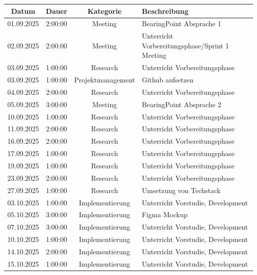 \documentclass{article}
\begin{document}
\begin{table}[H]
  \centering
  \begin{tabularx}{\textwidth}{|c|c|c|X|}
    \hline
    \rowcolor{black!10}\textbf{Datum} & \textbf{Dauer} & \textbf{Kategorie} & \textbf{Beschreibung} \\
    \hline
    01.09.2025 & 2:00:00 & Meeting           & BearingPoint Absprache 1 \\ \hline
    02.09.2025 & 2:00:00 & Meeting           & Unterricht Vorbereitungsphase/Sprint 1 Meeting \\ \hline
    03.09.2025 & 1:00:00 & Research          & Unterricht Vorbereitungsphase \\ \hline
    03.09.2025 & 1:00:00 & Projektmanagement & Github aufsetzen \\ \hline
    04.09.2025 & 2:00:00 & Research          & Unterricht Vorbereitungsphase \\ \hline
    05.09.2025 & 3:00:00 & Meeting           & BearingPoint Absprache 2 \\ \hline
    10.09.2025 & 1:00:00 & Research          & Unterricht Vorbereitungsphase \\ \hline
    11.09.2025 & 2:00:00 & Research          & Unterricht Vorbereitungsphase \\ \hline
    16.09.2025 & 2:00:00 & Research          & Unterricht Vorbereitungsphase \\ \hline
    17.09.2025 & 1:00:00 & Research          & Unterricht Vorbereitungsphase \\ \hline
    19.09.2025 & 1:00:00 & Research          & Unterricht Vorbereitungsphase \\ \hline
    23.09.2025 & 2:00:00 & Research          & Unterricht Vorbereitungsphase \\ \hline
    27.09.2025 & 1:00:00 & Research          & Umsetzung von Techstack \\ \hline
    03.10.2025 & 1:00:00 & Implementierung   & Unterricht Vorstudie, Development \\ \hline
    05.10.2025 & 3:00:00 & Implementierung   & Figma Mockup \\ \hline
    07.10.2025 & 3:00:00 & Implementierung   & Unterricht Vorstudie, Development \\ \hline
    10.10.2025 & 1:00:00 & Implementierung   & Unterricht Vorstudie, Development \\ \hline
    14.10.2025 & 2:00:00 & Implementierung   & Unterricht Vorstudie, Development \\ \hline
    15.10.2025 & 1:00:00 & Implementierung   & Unterricht Vorstudie, Development \\ \hline

\end{tabularx}
\end{table}
\end{document}
